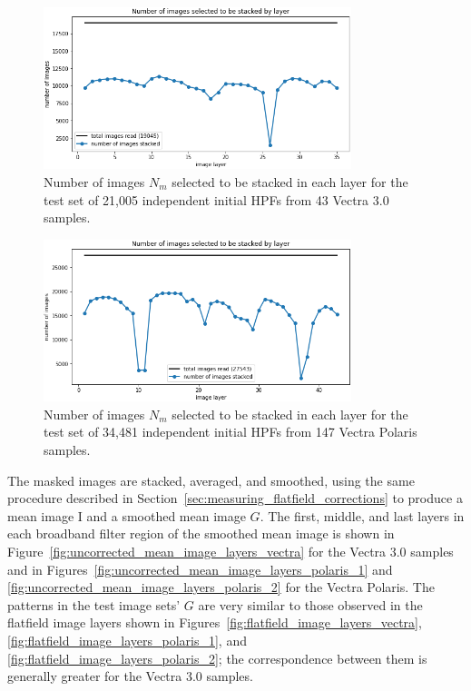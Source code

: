 \documentclass[letterpaper,11pt]{article}
\newcommand{\reffig}[1]{Figure~\ref{#1}}
\newcommand{\refsec}[1]{Section~\ref{#1}}
\newcommand{\Iota}{\mathrm{I}}
\begin{document}
\begin{figure}[!ht]
\centering
\includegraphics[width=0.8\textwidth]{images/results/n_images_stacked_per_layer_test_set_vectra}
\caption{\footnotesize Number of images $N_{m}$ selected to be stacked in each layer for the test set of 21,005 independent initial HPFs from 43 Vectra 3.0 samples.}
\label{fig:test_set_n_images_stacked_vectra}
\end{figure} 

\begin{figure}[!ht]
\centering
\includegraphics[width=0.8\textwidth]{images/results/n_images_stacked_per_layer_test_set_polaris}
\caption{\footnotesize Number of images $N_{m}$ selected to be stacked in each layer for the test set of 34,481 independent initial HPFs from 147 Vectra Polaris samples.}
\label{fig:test_set_n_images_stacked_polaris}
\end{figure} 

The masked images are stacked, averaged, and smoothed, using the same procedure described in \refsec{sec:measuring_flatfield_corrections} to produce a mean image $\Iota$ and a smoothed mean image $G$. The first, middle, and last layers in each broadband filter region of the smoothed mean image is shown in \reffig{fig:uncorrected_mean_image_layers_vectra} for the Vectra 3.0 samples and in Figures~\ref{fig:uncorrected_mean_image_layers_polaris_1} and \ref{fig:uncorrected_mean_image_layers_polaris_2} for the Vectra Polaris. The patterns in the test image sets' $G$ are very similar to those observed in the flatfield image layers shown in Figures~\ref{fig:flatfield_image_layers_vectra}, \ref{fig:flatfield_image_layers_polaris_1}, and \ref{fig:flatfield_image_layers_polaris_2}; the correspondence between them is generally greater for the Vectra 3.0 samples. 
\end{document}
